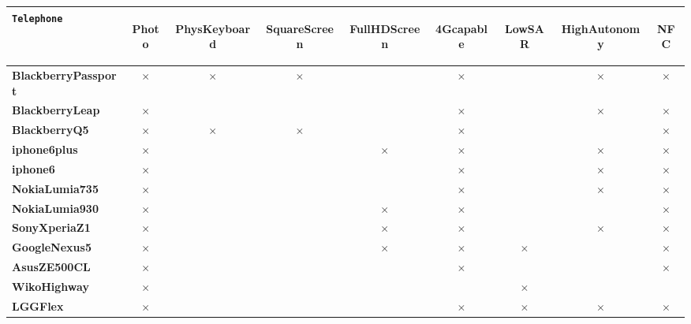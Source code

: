 \begin{tabular}{|l|*{8}{c|}}

\hline
\texttt{Telephone} & \begin{sideways}\textbf{Photo}\end{sideways} & \begin{sideways}\textbf{PhysKeyboard}\end{sideways} & \begin{sideways}\textbf{SquareScreen}\end{sideways} & \begin{sideways}\textbf{FullHDScreen}\end{sideways} & \begin{sideways}\textbf{4Gcapable}\end{sideways} & \begin{sideways}\textbf{LowSAR}\end{sideways} & \begin{sideways}\textbf{HighAutonomy}\end{sideways} & \begin{sideways}\textbf{NFC}\end{sideways}\\
\hline
\textbf{BlackberryPassport}& $\times$ & $\times$ & $\times$  & & $\times$  & & $\times$ & $\times$ \\
\hline
\textbf{BlackberryLeap}& $\times$  &  &  & & $\times$  & & $\times$ & $\times$ \\
\hline
\textbf{BlackberryQ5}& $\times$ & $\times$ & $\times$  & & $\times$  &  & & $\times$ \\
\hline
\textbf{iphone6plus}& $\times$  &  & & $\times$ & $\times$  & & $\times$ & $\times$ \\
\hline
\textbf{iphone6}& $\times$  &  &  & & $\times$  & & $\times$ & $\times$ \\
\hline
\textbf{NokiaLumia735}& $\times$  &  &  & & $\times$  & & $\times$ & $\times$ \\
\hline
\textbf{NokiaLumia930}& $\times$  &  & & $\times$ & $\times$  &  & & $\times$ \\
\hline
\textbf{SonyXperiaZ1}& $\times$  &  & & $\times$ & $\times$  & & $\times$ & $\times$ \\
\hline
\textbf{GoogleNexus5}& $\times$  &  & & $\times$ & $\times$ & $\times$  & & $\times$ \\
\hline
\textbf{AsusZE500CL}& $\times$  &  &  & & $\times$  &  & & $\times$ \\
\hline
\textbf{WikoHighway}& $\times$  &  &  &  & & $\times$  &  & \\
\hline
\textbf{LGGFlex}& $\times$  &  &  & & $\times$ & $\times$ & $\times$ & $\times$ \\
\hline
\end{tabular}
